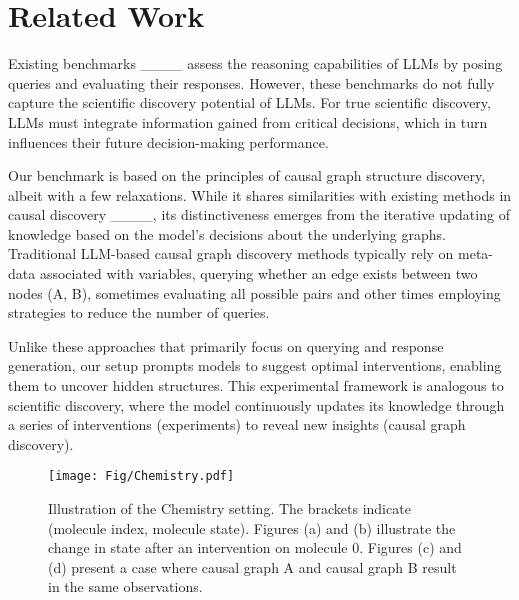 \section{Related Work}
Existing benchmarks ____  assess the reasoning capabilities of LLMs by posing queries and evaluating their responses. However, these benchmarks do not fully capture the scientific discovery potential of LLMs. For true scientific discovery, LLMs must integrate information gained from critical decisions, which in turn influences their future decision-making performance. 

Our benchmark is based on the principles of causal graph structure discovery, albeit with a few relaxations. While it shares similarities with existing methods in causal discovery ____, its distinctiveness emerges from the iterative updating of knowledge based on the model's decisions about the underlying graphs. Traditional LLM-based causal graph discovery methods typically rely on meta-data associated with variables, querying whether an edge exists between two nodes (A, B), sometimes evaluating all possible pairs and other times employing strategies to reduce the number of queries. 

Unlike these approaches that primarily focus on querying and response generation, our setup prompts models to suggest optimal interventions, enabling them to uncover hidden structures. This experimental framework is analogous to scientific discovery, where the model continuously updates its knowledge through a series of interventions (experiments) to reveal new insights (causal graph discovery).

\begin{figure}[t]
\centering
{\texttt{[image: Fig/Chemistry.pdf]}
}\\
\caption{Illustration of the Chemistry setting. The brackets indicate (molecule index, molecule state). Figures (a) and (b) illustrate the change in state after an intervention on molecule 0. Figures (c) and (d) present a case where causal graph A and causal graph B result in the same observations.}
\label{Chemistry}
\end{figure}
